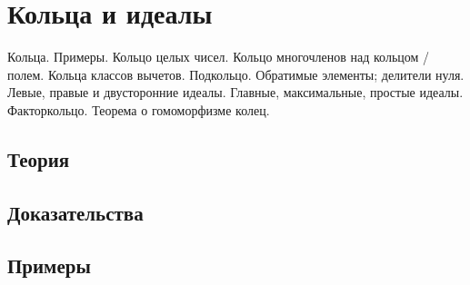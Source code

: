 
\section{Кольца и идеалы}
\label{sec:2.2.13-rings-ideals}

\begin{ticket}
Кольца. Примеры. Кольцо целых чисел. Кольцо многочленов над кольцом / полем. Кольца классов вычетов. Подкольцо. Обратимые элементы; делители нуля. Левые, правые и двусторонние идеалы. Главные, максимальные, простые идеалы. Факторкольцо. Теорема о гомоморфизме колец.
\end{ticket}

\subsection*{Теория}

\subsection*{Доказательства}

\subsection*{Примеры}
